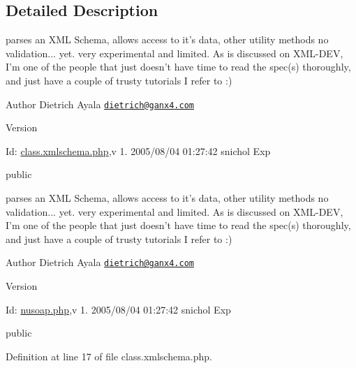 \subsection{Detailed Description}
parses an X\-M\-L Schema, allows access to it's data, other utility methods no validation... yet. very experimental and limited. As is discussed on X\-M\-L-\/\-D\-E\-V, I'm one of the people that just doesn't have time to read the spec(s) thoroughly, and just have a couple of trusty tutorials I refer to \-:)

\begin{DoxyAuthor}{Author}
Dietrich Ayala \href{mailto:dietrich@ganx4.com}{\tt dietrich@ganx4.\-com} 
\end{DoxyAuthor}
\begin{DoxyVersion}{Version}

\end{DoxyVersion}
\begin{DoxyParagraph}{Id\-:}
\hyperlink{class_8xmlschema_8php_source}{class.\-xmlschema.\-php},v 1. 2005/08/04 01\-:27\-:42 snichol Exp 
\end{DoxyParagraph}
public

parses an X\-M\-L Schema, allows access to it's data, other utility methods no validation... yet. very experimental and limited. As is discussed on X\-M\-L-\/\-D\-E\-V, I'm one of the people that just doesn't have time to read the spec(s) thoroughly, and just have a couple of trusty tutorials I refer to \-:)

\begin{DoxyAuthor}{Author}
Dietrich Ayala \href{mailto:dietrich@ganx4.com}{\tt dietrich@ganx4.\-com} 
\end{DoxyAuthor}
\begin{DoxyVersion}{Version}

\end{DoxyVersion}
\begin{DoxyParagraph}{Id\-:}
\hyperlink{nusoap_8php_source}{nusoap.\-php},v 1. 2005/08/04 01\-:27\-:42 snichol Exp 
\end{DoxyParagraph}
public 

Definition at line 17 of file class.\-xmlschema.\-php.



